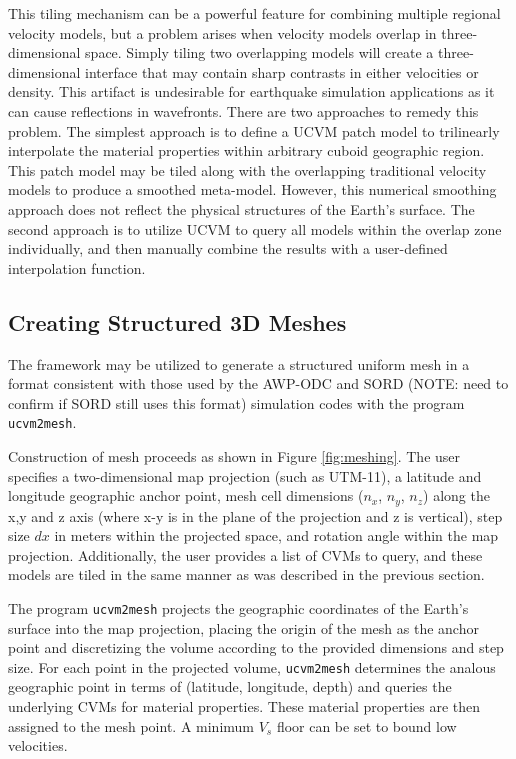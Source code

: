 This tiling mechanism can be a powerful feature for combining multiple regional velocity models, but a problem arises when velocity models overlap in three-dimensional space. Simply tiling two overlapping models will create a three-dimensional interface that may contain sharp contrasts in either velocities or density. This artifact is undesirable for earthquake simulation applications as it can cause reflections in wavefronts. There are two approaches to remedy this problem. The simplest approach is to define a UCVM patch model to trilinearly interpolate the material properties within arbitrary cuboid geographic region. This patch model may be tiled along with the overlapping traditional velocity models to produce a smoothed meta-model. However, this numerical smoothing approach does not reflect the physical structures of the Earth's surface. The second approach is to utilize UCVM to query all models within the overlap zone individually, and then manually combine the results with a user-defined interpolation function. 



\subsection{Creating Structured 3D Meshes}

The framework may be utilized to generate a structured uniform mesh in a format consistent with those used by the AWP-ODC and SORD (NOTE: need to confirm if SORD still uses this format) simulation codes with the program \texttt{ucvm2mesh}.

Construction of mesh proceeds as shown in Figure \ref{fig:meshing}. The user specifies a two-dimensional map projection (such as UTM-11), a latitude and longitude geographic anchor point, mesh cell dimensions ($n_x$, $n_y$, $n_z$) along the x,y and z axis (where x-y is in the plane of the projection and z is vertical), step size $dx$ in meters within the projected space, and rotation angle within the map projection. Additionally, the user provides a list of CVMs to query, and these models are tiled in the same manner as was described in the previous section.

The program \texttt{ucvm2mesh} projects the geographic coordinates of the Earth's surface into the map projection, placing the origin of the mesh as the anchor point and discretizing the volume according to the provided dimensions and step size. For each point in the projected volume, \texttt{ucvm2mesh} determines the analous geographic point in terms of (latitude, longitude, depth) and queries the underlying CVMs for material properties. These material properties are then assigned to the mesh point. A minimum $V_s$ floor can be set to bound low velocities.

